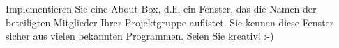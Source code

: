 Implementieren Sie eine About-Box, d.h. ein Fenster, das die Namen der
beteiligten Mitglieder Ihrer Projektgruppe auflistet. Sie kennen
diese Fenster sicher aus vielen bekannten Programmen. Seien Sie
kreativ! :-)
